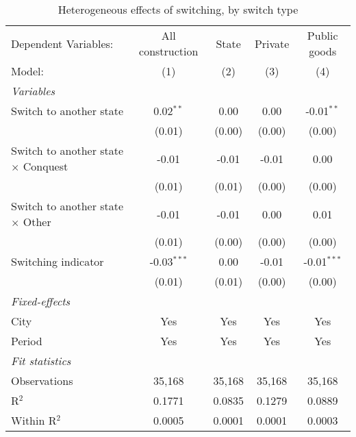 \begin{table}[htbp]
   \caption{\label{tab:baseline_10y} Heterogeneous effects of switching, by switch type}
   \centering
   \begin{tabular}{lcccc}
      \tabularnewline \midrule \midrule
      Dependent Variables:                       & All construction & State  & Private & Public goods\\  
      Model:                                     & (1)              & (2)    & (3)     & (4)\\  
      \midrule
      \emph{Variables}\\
      Switch to another state                    & 0.02$^{**}$      & 0.00   & 0.00    & -0.01$^{**}$\\   
                                                 & (0.01)           & (0.00) & (0.00)  & (0.00)\\   
      Switch to another state $\times$ Conquest  & -0.01            & -0.01  & -0.01   & 0.00\\   
                                                 & (0.01)           & (0.01) & (0.00)  & (0.00)\\   
      Switch to another state $\times$ Other     & -0.01            & -0.01  & 0.00    & 0.01\\   
                                                 & (0.01)           & (0.00) & (0.00)  & (0.00)\\   
      Switching indicator                        & -0.03$^{***}$    & 0.00   & -0.01   & -0.01$^{***}$\\   
                                                 & (0.01)           & (0.01) & (0.00)  & (0.00)\\   
      \midrule
      \emph{Fixed-effects}\\
      City                                       & Yes              & Yes    & Yes     & Yes\\  
      Period                                     & Yes              & Yes    & Yes     & Yes\\  
      \midrule
      \emph{Fit statistics}\\
      Observations                               & 35,168           & 35,168 & 35,168  & 35,168\\  
      R$^2$                                      & 0.1771           & 0.0835 & 0.1279  & 0.0889\\  
      Within R$^2$                               & 0.0005           & 0.0001 & 0.0001  & 0.0003\\  
      \midrule \midrule
      

\end{tabular}
\end{table}
